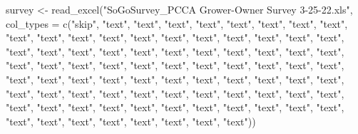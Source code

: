 \documentclass[
]{article}
\newenvironment{Shaded}{\begin{snugshade}}{\end{snugshade}}
\newcommand{\AttributeTok}[1]{\textcolor[rgb]{0.77,0.63,0.00}{#1}}
\newcommand{\FunctionTok}[1]{\textcolor[rgb]{0.00,0.00,0.00}{#1}}
\newcommand{\NormalTok}[1]{#1}
\newcommand{\OtherTok}[1]{\textcolor[rgb]{0.56,0.35,0.01}{#1}}
\newcommand{\StringTok}[1]{\textcolor[rgb]{0.31,0.60,0.02}{#1}}
\begin{document}
\begin{Shaded}
\begin{Highlighting}[]
\NormalTok{survey }\OtherTok{\textless{}{-}} \FunctionTok{read\_excel}\NormalTok{(}\StringTok{"SoGoSurvey\_PCCA Grower{-}Owner Survey 3{-}25{-}22.xls"}\NormalTok{,}
    \AttributeTok{col\_types =} \FunctionTok{c}\NormalTok{(}\StringTok{"skip"}\NormalTok{, }\StringTok{"text"}\NormalTok{, }\StringTok{"text"}\NormalTok{, }\StringTok{"text"}\NormalTok{, }\StringTok{"text"}\NormalTok{, }\StringTok{"text"}\NormalTok{,}
        \StringTok{"text"}\NormalTok{, }\StringTok{"text"}\NormalTok{, }\StringTok{"text"}\NormalTok{, }\StringTok{"text"}\NormalTok{, }\StringTok{"text"}\NormalTok{, }\StringTok{"text"}\NormalTok{, }\StringTok{"text"}\NormalTok{,}
        \StringTok{"text"}\NormalTok{, }\StringTok{"text"}\NormalTok{, }\StringTok{"text"}\NormalTok{, }\StringTok{"text"}\NormalTok{, }\StringTok{"text"}\NormalTok{, }\StringTok{"text"}\NormalTok{, }\StringTok{"text"}\NormalTok{,}
        \StringTok{"text"}\NormalTok{, }\StringTok{"text"}\NormalTok{, }\StringTok{"text"}\NormalTok{, }\StringTok{"text"}\NormalTok{, }\StringTok{"text"}\NormalTok{, }\StringTok{"text"}\NormalTok{, }\StringTok{"text"}\NormalTok{,}
        \StringTok{"text"}\NormalTok{, }\StringTok{"text"}\NormalTok{, }\StringTok{"text"}\NormalTok{, }\StringTok{"text"}\NormalTok{, }\StringTok{"text"}\NormalTok{, }\StringTok{"text"}\NormalTok{, }\StringTok{"text"}\NormalTok{,}
        \StringTok{"text"}\NormalTok{, }\StringTok{"text"}\NormalTok{, }\StringTok{"text"}\NormalTok{, }\StringTok{"text"}\NormalTok{, }\StringTok{"text"}\NormalTok{, }\StringTok{"text"}\NormalTok{, }\StringTok{"text"}\NormalTok{,}
        \StringTok{"text"}\NormalTok{, }\StringTok{"text"}\NormalTok{, }\StringTok{"text"}\NormalTok{, }\StringTok{"text"}\NormalTok{, }\StringTok{"text"}\NormalTok{, }\StringTok{"text"}\NormalTok{, }\StringTok{"text"}\NormalTok{,}
        \StringTok{"text"}\NormalTok{, }\StringTok{"text"}\NormalTok{, }\StringTok{"text"}\NormalTok{, }\StringTok{"text"}\NormalTok{, }\StringTok{"text"}\NormalTok{, }\StringTok{"text"}\NormalTok{, }\StringTok{"text"}\NormalTok{,}
        \StringTok{"text"}\NormalTok{, }\StringTok{"text"}\NormalTok{, }\StringTok{"text"}\NormalTok{, }\StringTok{"text"}\NormalTok{, }\StringTok{"text"}\NormalTok{, }\StringTok{"text"}\NormalTok{, }\StringTok{"text"}\NormalTok{,}
        \StringTok{"text"}\NormalTok{, }\StringTok{"text"}\NormalTok{, }\StringTok{"text"}\NormalTok{, }\StringTok{"text"}\NormalTok{, }\StringTok{"text"}\NormalTok{, }\StringTok{"text"}\NormalTok{, }\StringTok{"text"}\NormalTok{,}
        \StringTok{"text"}\NormalTok{, }\StringTok{"text"}\NormalTok{, }\StringTok{"text"}\NormalTok{, }\StringTok{"text"}\NormalTok{, }\StringTok{"text"}\NormalTok{, }\StringTok{"text"}\NormalTok{, }\StringTok{"text"}\NormalTok{,}
        \StringTok{"text"}\NormalTok{, }\StringTok{"text"}\NormalTok{, }\StringTok{"text"}\NormalTok{, }\StringTok{"text"}\NormalTok{, }\StringTok{"text"}\NormalTok{, }\StringTok{"text"}\NormalTok{, }\StringTok{"text"}\NormalTok{))}


\end{Highlighting}
\end{Shaded}
\end{document}
